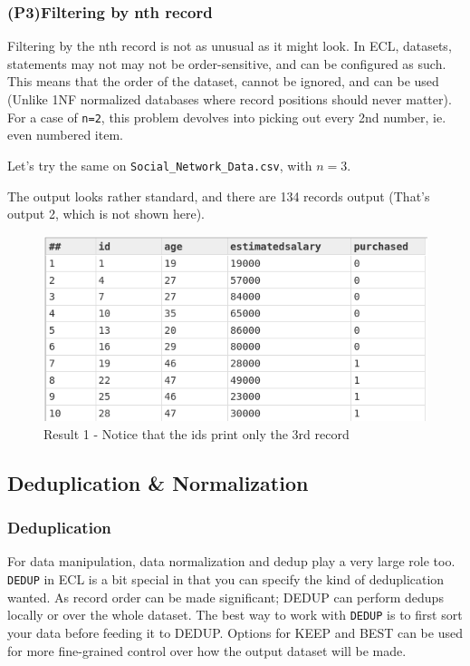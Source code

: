 \subsubsection[Filtering \textit{n}\textsuperscript{th} record]{(P3)Filtering by nth record}

Filtering by the nth record is not as unusual as it might look. In ECL, datasets, statements may not may not be order-sensitive, and can be configured as such. This means that the order of the dataset, cannot be ignored, and can be used (Unlike 1NF normalized databases where record positions should never matter).
For a case of \lstinline!n=2!, this problem devolves into picking out every 2nd number, ie. even numbered item.

Let's try the same on \lstinline!Social_Network_Data.csv!, with $n=3$.




The output looks rather standard, and there are 134 records output (That's output 2, which is not shown here).

\begin{figure}[h]
    \centering
    \includegraphics[width=.75\linewidth]{../output/27/1filt_op}
    \caption{Result 1 - Notice that the ids print only the 3rd record}
\end{figure}
\pagebreak
\subsection{Deduplication \& Normalization}

\subsubsection{Deduplication}

For data manipulation, data normalization and dedup play a very large role too. \lstinline{DEDUP} in ECL is a bit special in that you can specify the kind of deduplication wanted. As record order can be made significant; DEDUP can perform dedups locally or over the whole dataset.
The best way to work with \lstinline{DEDUP} is to first sort your data before feeding it to DEDUP. Options for KEEP and BEST can be used for more fine-grained control over how the output dataset will be made.

